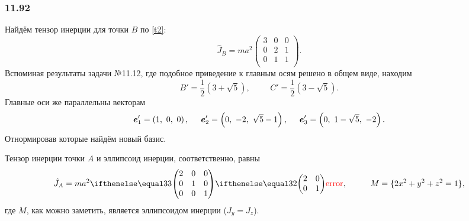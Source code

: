 \subsubsection*{11.92}
Найдём тензор инерции для точки $B$ по \eqref{t2}:
\begin{equation*}
    \hat{J}_B = ma^2 
    \begin{pmatrix}
        3 & 0 & 0 \\
        0 & 2 & 1 \\
        0 & 1 & 1 \\
    \end{pmatrix}.
\end{equation*}
Вспоминая результаты задачи №11.12, где подобное приведение к главным осям решено в общем виде, находим
\begin{equation*}
    B' = \frac{1}{2} \left(3+\sqrt{5}\right), \hspace{1cm}
    C' = \frac{1}{2} \left(3 - \sqrt{5} \right).
\end{equation*}
Главные оси же параллельны векторам
\begin{equation*}
    \mbox{\boldmath $e$}_1' = \left(1,\ 0,\ 0\right), \hspace{0.5cm} 
    \mbox{\boldmath $e$}_2' = \left(0,\ -2,\ \sqrt{5}-1\right), \hspace{0.5cm} 
    \mbox{\boldmath $e$}_3' = \left(0,\ 1-\sqrt{5},\ -2\right).
\end{equation*}
Отнормировав которые найдём новый базис.

Тензор инерции точки $A$ и эллипсоид инерции, соответственно, равны
\begin{equation*}
    \hat{J}_A = ma^2 \dmat{3}{2}{1}{1},
    \hspace{1cm} 
    M = \{2x^2 + y^2 + z^2 = 1\},
\end{equation*}
где $M$, как можно заметить, является эллипсоидом инерции ($J_y = J_z$).
